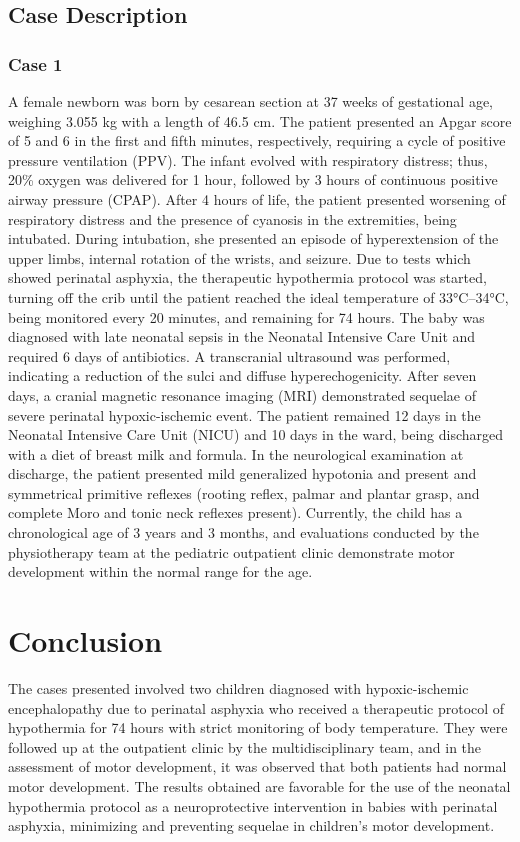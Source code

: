 \documentclass[11pt,a4paper]{article}
\begin{document}
	\subsection{Case Description}
	\subsubsection{Case 1}
	A female newborn was born by cesarean section at 37 weeks of gestational age, weighing 3.055 kg with a length of 46.5 cm. The patient presented an Apgar score of 5 and 6 in the first and fifth minutes, respectively, requiring a cycle of positive pressure ventilation (PPV). The infant evolved with respiratory distress; thus, 20\% oxygen was delivered for 1 hour, followed by 3 hours of continuous positive airway pressure (CPAP). After 4 hours of life, the patient presented worsening of respiratory distress and the presence of cyanosis in the extremities, being intubated. During intubation, she presented an episode of hyperextension of the upper limbs, internal rotation of the wrists, and seizure. Due to tests which showed perinatal asphyxia, the therapeutic hypothermia protocol was started, turning off the crib until the patient reached the ideal temperature of 33°C--34°C, being monitored every 20 minutes, and remaining for 74 hours. The baby was diagnosed with late neonatal sepsis in the Neonatal Intensive Care Unit and required 6 days of antibiotics. A transcranial ultrasound was performed, indicating a reduction of the sulci and diffuse hyperechogenicity. After seven days, a cranial magnetic resonance imaging (MRI) demonstrated sequelae of severe perinatal hypoxic-ischemic event. The patient remained 12 days in the Neonatal Intensive Care Unit (NICU) and 10 days in the ward, being discharged with a diet of breast milk and formula. In the neurological examination at discharge, the patient presented mild generalized hypotonia and present and symmetrical primitive reflexes (rooting reflex, palmar and plantar grasp, and complete Moro and tonic neck reflexes present). Currently, the child has a chronological age of 3 years and 3 months, and evaluations conducted by the physiotherapy team at the pediatric outpatient clinic demonstrate motor development within the normal range for the age.
		
	\section{Conclusion}
	The cases presented involved two children diagnosed with hypoxic-ischemic encephalopathy due to perinatal asphyxia who received a therapeutic protocol of hypothermia for 74 hours with strict monitoring of body temperature. They were followed up at the outpatient clinic by the multidisciplinary team, and in the assessment of motor development, it was observed that both patients had normal motor development. The results obtained are favorable for the use of the neonatal hypothermia protocol as a neuroprotective intervention in babies with perinatal asphyxia, minimizing and preventing sequelae in children's motor development.
	
	\newpage
	
	\printbibliography[title=References]
		
\end{document}
